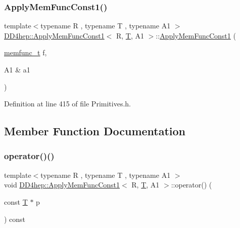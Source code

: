 \subsubsection{\texorpdfstring{Apply\+Mem\+Func\+Const1()}{ApplyMemFuncConst1()}}
{\footnotesize\ttfamily template$<$typename R , typename T , typename A1 $>$ \\
\hyperlink{struct_d_d4hep_1_1_apply_mem_func_const1}{D\+D4hep\+::\+Apply\+Mem\+Func\+Const1}$<$ R, \hyperlink{class_t}{T}, A1 $>$\+::\hyperlink{struct_d_d4hep_1_1_apply_mem_func_const1}{Apply\+Mem\+Func\+Const1} (\begin{DoxyParamCaption}\item[{\hyperlink{struct_d_d4hep_1_1_apply_mem_func_const1_ac708abd841ccaac1d1f920a5139b68ce}{memfunc\+\_\+t}}]{f,  }\item[{A1 \&}]{a1 }\end{DoxyParamCaption})\hspace{0.3cm}{\ttfamily [inline]}}



Definition at line 415 of file Primitives.\+h.



\subsection{Member Function Documentation}
\hypertarget{struct_d_d4hep_1_1_apply_mem_func_const1_a9d76abcb9c2a7df2c8764b2cd3de6397}{}\label{struct_d_d4hep_1_1_apply_mem_func_const1_a9d76abcb9c2a7df2c8764b2cd3de6397} 
\subsubsection{\texorpdfstring{operator()()}{operator()()}}
{\footnotesize\ttfamily template$<$typename R , typename T , typename A1 $>$ \\
void \hyperlink{struct_d_d4hep_1_1_apply_mem_func_const1}{D\+D4hep\+::\+Apply\+Mem\+Func\+Const1}$<$ R, \hyperlink{class_t}{T}, A1 $>$\+::operator() (\begin{DoxyParamCaption}\item[{const \hyperlink{class_t}{T} $\ast$}]{p }\end{DoxyParamCaption}) const\hspace{0.3cm}{\ttfamily [inline]}}



